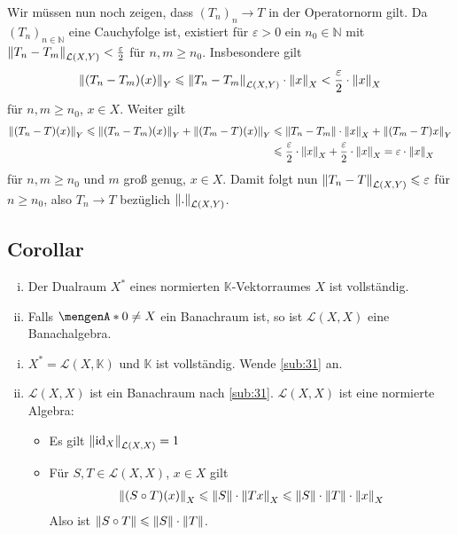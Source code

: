 Wir müssen nun noch zeigen, dass $(T_n)_n \to T$ in der Operatornorm gilt. Da $(T_n)_{n \in \mathds{N}}$ eine Cauchyfolge ist, existiert für $\varepsilon >0$ ein
$n_0 \in \mathds{N}$ mit $\norm[\mathcal{L}(X,Y)]{T_n - T_m}  < \frac{\varepsilon}{2} $ für $n,m \ge n_0$. Insbesondere gilt
\begin{align*}
	\norm[Y]{(T_n- T_m)(x)} \le \norm[\mathcal{L}(X,Y)]{T_n -T_m} \cdot \norm[X]{x} < \frac{\varepsilon}{2}  \cdot \norm[X]{x}    
\end{align*}
für $n,m \ge n_0$, $x \in X$. Weiter gilt 
\begin{align*}
	\norm[Y]{(T_n- T)(x)} \le \norm[Y]{(T_n - T_m)(x)} + \norm[Y]{(T_m-T)(x)} &\le \norm{T_n - T_m} \cdot \norm[X]{x} + \norm[Y]{(T_m-T)x} \\
	&\le \frac{\varepsilon}{2}  \cdot \norm[X]{x} + \frac{\varepsilon}{2}  \cdot \norm[X]{x}  = \varepsilon \cdot \norm[X]{x} 
\end{align*}
für $n,m \ge n_0$ und $m$ groß genug, $x \in X$. Damit folgt nun
$\norm[\mathcal{L}(X,Y)]{T_n -T} \le \varepsilon$ für $n \ge n_0$, also $T_n \to T$ bezüglich $\norm[\mathcal{L}(X,Y)]{.}$. \bewende

\subsection[Corollar: Dualraum ist vollständig und $\mathcal{L}(X,X)$ ist Banachalgebra, falls $X$ Banachraum]{Corollar} %
\label{sub:32}
\begin{enumerate}[(i)]
	\item Der Dualraum $X^*$ eines normierten $\mathds{K}$-Vektorraumes $X$ ist vollständig. 
	\item Falls $\set{0} \not= X$ ein Banachraum ist, so ist $\mathcal{L}(X,X)$ eine Banachalgebra.
\end{enumerate}
\begin{enumerate}[(i)]
	\item $X^*=\mathcal{L}(X,\mathds{K})$ und $\mathds{K}$ ist vollständig. Wende \ref{sub:31} an.
	\item $\mathcal{L}(X,X)$ ist ein Banachraum nach \ref{sub:31}. $\mathcal{L}(X,X)$ ist eine normierte Algebra: 
	\begin{itemize}
		\item Es gilt $\norm[\mathcal{L}(X,X)]{\id_X}=1$
		\item Für $S,T \in \mathcal{L}(X,X)$, $x \in X$ gilt
		\begin{align*}
			\norm[X]{(S \circ T)(x)} \le \norm{S} \cdot \norm[X]{T x} \le \norm{S} \cdot \norm{T} \cdot \norm[X]{x}   
		\end{align*}
		Also ist $\norm{S \circ T} \le \norm{S} \cdot \norm{T}$. \bewende
	\end{itemize}
\end{enumerate}

